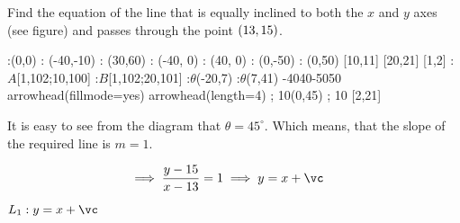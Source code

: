 



\SUBTRACT\vb\va\vc

\question[2] Find the equation of the line that is equally inclined to both the 
$x$ and $y$ axes (see figure) and passes through the point $(13, 15)$.

\watchout

  \def\xmin{-40}
  \def\xmax{40}
  \def\ymin{-50}
  \def\ymax{50}
  \def\rotangle{45}
  :(0,0)
  : (-40,-10)
  : (30,60)
  : (\xmin, 0)
  : (\xmax, 0)
  : (0,\ymin)
  : (0,\ymax)
   [10,11] %
   [20,21] %
   [1,2]
   :$A$[1,102;10,100]
   :$B$[1,102;20,101]
  :$\theta$(-20,7)
  :$\theta$(7,41)
\figdrawbegin{}
  \xmin\xmax\ymin\ymax
  \figdrawline [1,2]
  \figset arrowhead(fillmode=yes)
  \figdrawarrowhead [1,2]
  \figdrawarrowhead [2,1]
  \figset arrowhead(length=4) 
   ; 10(0,45)
   ; 10 [2,21]
\figdrawend
{}

\vspace{1cm}
\centerline{\box\figBoxA}

\begin{solution}[\halfpage]
    It is easy to see from the diagram that $\theta=45^\circ$. Which means, that the slope of the 
    required line is $m=1$.

    \begin{align}
    	\implies \dfrac{y-\vb}{x-\va} &= 1 \implies y = x + \vc
    \end{align}
\end{solution}

\ifprintanswers
  \begin{codex}
    $L_1: y = x + \vc$
  \end{codex}
\fi
